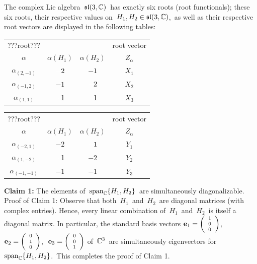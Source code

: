 \vskip 0.5cm
\begin{proposition}
\mbox{}
\vskip 0.05cm
\noindent
The complex Lie algebra \,$\mathfrak{sl}(3,\mathbb{C})$\, has exactly six roots (root functionals);
these six roots, their respective values on \,$H_{1}, H_{2} \in \mathfrak{sl}(3,\mathbb{C})$,\,
as well as their respective root vectors are displayed in the following tables:
\begin{center}
\begin{tabular}{|c|c|c|c|}
\hline
{\color{white}???}root{\color{white}???}& & & root vector \\
$\alpha$ & $\alpha(H_{1})$ & $\alpha(H_{2})$ & $Z_{\alpha}$ \\
\hline\hline
$\alpha_{(2,-1)}$ & ${\color{white}+}2$ & $-1$ & $X_{1}$ \\
\hline
$\alpha_{(-1,2)}$ & $-1$ & ${\color{white}+}2$ & $X_{2}$ \\
\hline
$\alpha_{(1,1)}$ & ${\color{white}+}1$ & ${\color{white}+}1$ & $X_{3}$ \\
\hline
\end{tabular}
\quad\quad
\begin{tabular}{|c|c|c|c|}
\hline
{\color{white}???}root{\color{white}???}& & & root vector \\
$\alpha$ & $\alpha(H_{1})$ & $\alpha(H_{2})$ & $Z_{\alpha}$ \\
\hline\hline
$\alpha_{(-2,1)}$ & $-2$ & ${\color{white}+}1$ & $Y_{1}$ \\
\hline
$\alpha_{(1,-2)}$ & ${\color{white}+}1$ & $-2$ & $Y_{2}$ \\
\hline
$\alpha_{(-1,-1)}$ & $-1$ & $-1$ & $Y_{3}$ \\
\hline
\end{tabular}
\end{center}
\end{proposition}
\proof
\vskip 0.2cm
\noindent
\textbf{Claim 1:}\;\; The elements of \,$\textnormal{span}_{\mathbb{C}}\{H_{1},H_{2}\}$\, are simultaneously diagonalizable.
\vskip 0.1cm
\noindent
Proof of Claim 1:\;\;
Observe that both \,$H_{1}$\, and \,$H_{2}$\, are diagonal matrices (with complex entries).
Hence, every linear combination of \,$H_{1}$\, and \,$H_{2}$\, is itself a diagonal matrix.
In particular, the standard basis vectors
\;$\mathbf{e}_{1} = {\scriptsize\left(\begin{array}{c} 1 \\ 0 \\ 0\end{array}\right)}$,\,
\,$\mathbf{e}_{2} = {\scriptsize\left(\begin{array}{c} 0 \\ 1 \\ 0\end{array}\right)}$,\,
\,$\mathbf{e}_{3} = {\scriptsize\left(\begin{array}{c} 0 \\ 0 \\ 1\end{array}\right)}$\;
of \,$\mathbb{C}^{3}$\, are simultaneously eigenvectors for
\,$\textnormal{span}_{\mathbb{C}}\{H_{1},H_{2}\}$.\,
This completes the proof of Claim 1.

